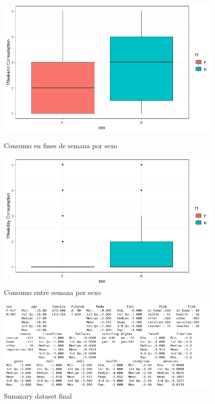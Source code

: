 \documentclass[12pt,a4paper]{article}
\begin{document}
\begin{figure}[ht!]
  \centering
  \begin{minipage}[b]{0.4\textwidth}
    \includegraphics[trim = 0mm 0mm 0mm 0mm, clip,scale=0.4]{images/boxplot_walc_sex}
    \caption{Consumo en fines de semana por sexo}
  \end{minipage}
  \hfill
  \begin{minipage}[b]{0.4\textwidth}
    \includegraphics[trim = 0mm 0mm 0mm 0mm, clip,scale=0.4]{images/boxplot_dalc_sex}
    \caption{Consumo entre semana por sexo}
  \end{minipage}
\end{figure}


\begin{figure}[ht!]
	\centering
	\includegraphics[trim = 0mm 0mm 0mm 0mm, clip,scale=0.4]{images/summary_final}
	\caption{Summary dataset final}
	\label{fig:sum4}
\end{figure}
\end{document}
